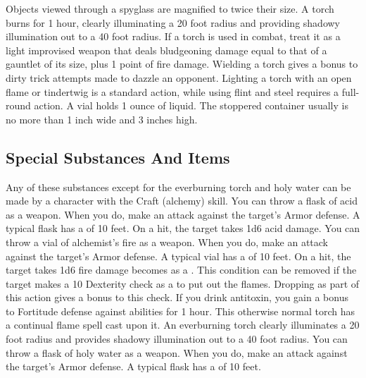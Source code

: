          Objects viewed through a spyglass are magnified to twice their size.
         A torch burns for 1 hour, clearly illuminating a 20 foot radius and providing shadowy illumination out to a 40 foot radius. If a torch is used in combat, treat it as a light improvised weapon that deals bludgeoning damage equal to that of a gauntlet of its size, plus 1 point of fire damage. Wielding a torch gives a  bonus to dirty trick attempts made to dazzle an opponent. Lighting a torch with an open flame or tindertwig is a standard action, while using flint and steel requires a full-round action.
         A vial holds 1 ounce of liquid. The stoppered container usually is no more than 1 inch wide and 3 inches high.

    \subsection{Special Substances And Items}
        Any of these substances except for the everburning torch and holy water can be made by a character with the Craft (alchemy) skill.
         You can throw a flask of acid as a weapon.
        When you do, make an attack against the target's Armor defense.
        A typical flask has a  of 10 feet.
        On a hit, the target takes 1d6 acid damage.
         You can throw a vial of alchemist's fire as a weapon.
        When you do, make an attack against the target's Armor defense.
        A typical vial has a  of 10 feet.
        On a hit, the target takes 1d6 fire damage becomes  as a .
        This condition can be removed if the target makes a  10 Dexterity check as a  to put out the flames.
        Dropping  as part of this action gives a  bonus to this check.
         If you drink antitoxin, you gain a  bonus to Fortitude defense against  abilities for 1 hour.
         This otherwise normal torch has a continual flame spell cast upon it. An everburning torch clearly illuminates a 20 foot radius and provides shadowy illumination out to a 40 foot radius.
         You can throw a flask of holy water as a weapon.
        When you do, make an attack against the target's Armor defense.
        A typical flask has a  of 10 feet.
